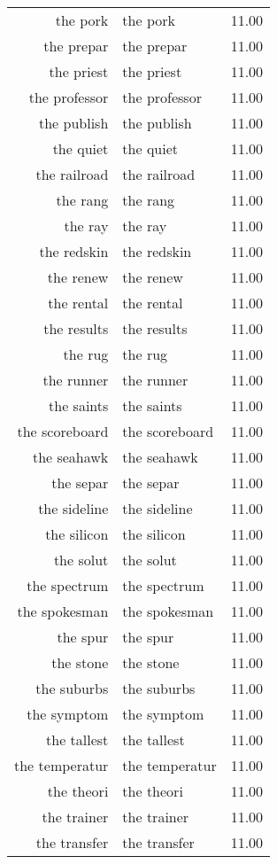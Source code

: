 \begin{table}[ht]
\begin{tabular}{rlr}
  the pork & the pork & 11.00 \\ 
  the prepar & the prepar & 11.00 \\ 
  the priest & the priest & 11.00 \\ 
  the professor & the professor & 11.00 \\ 
  the publish & the publish & 11.00 \\ 
  the quiet & the quiet & 11.00 \\ 
  the railroad & the railroad & 11.00 \\ 
  the rang & the rang & 11.00 \\ 
  the ray & the ray & 11.00 \\ 
  the redskin & the redskin & 11.00 \\ 
  the renew & the renew & 11.00 \\ 
  the rental & the rental & 11.00 \\ 
  the results & the results & 11.00 \\ 
  the rug & the rug & 11.00 \\ 
  the runner & the runner & 11.00 \\ 
  the saints & the saints & 11.00 \\ 
  the scoreboard & the scoreboard & 11.00 \\ 
  the seahawk & the seahawk & 11.00 \\ 
  the separ & the separ & 11.00 \\ 
  the sideline & the sideline & 11.00 \\ 
  the silicon & the silicon & 11.00 \\ 
  the solut & the solut & 11.00 \\ 
  the spectrum & the spectrum & 11.00 \\ 
  the spokesman & the spokesman & 11.00 \\ 
  the spur & the spur & 11.00 \\ 
  the stone & the stone & 11.00 \\ 
  the suburbs & the suburbs & 11.00 \\ 
  the symptom & the symptom & 11.00 \\ 
  the tallest & the tallest & 11.00 \\ 
  the temperatur & the temperatur & 11.00 \\ 
  the theori & the theori & 11.00 \\ 
  the trainer & the trainer & 11.00 \\ 
  the transfer & the transfer & 11.00 \\ 

\end{tabular}
\end{table}
